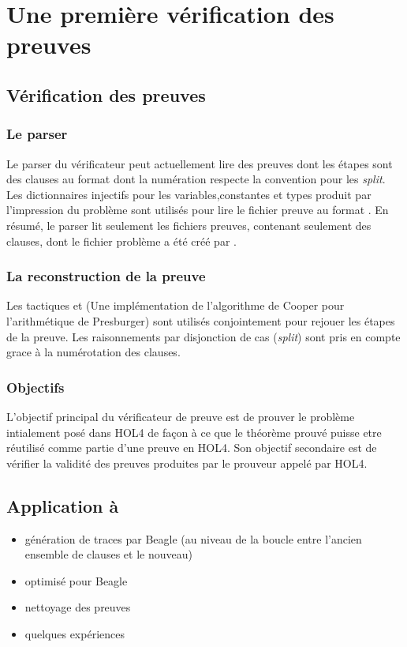 \section{Une première vérification des preuves \tff}
\label{sec:traces}

\subsection{Vérification des preuves}

\subsubsection{Le parser}
Le parser du vérificateur peut actuellement lire des preuves dont les étapes sont des clauses au format \tff dont la numération respecte la convention \tff pour les \textit{split}. Les dictionnaires injectifs pour les variables,constantes et types produit par l'impression du problème sont utilisés pour lire le fichier preuve au format \tff. En résumé, le parser lit seulement les fichiers preuves, contenant seulement des clauses, dont le fichier problème a été créé par \holfour.

\subsubsection{La reconstruction de la preuve}
Les tactiques \metistac et \coopertac (Une implémentation de l'algorithme de Cooper pour l'arithmétique de Presburger)
sont utilisés conjointement pour rejouer les étapes de la preuve. 
Les raisonnements par disjonction de cas (\textit{split}) sont pris en compte grace à la numérotation des clauses.

\subsubsection{Objectifs}
L'objectif principal du vérificateur de preuve est de prouver le problème intialement posé dans HOL4 de façon à ce que le théorème prouvé puisse etre réutilisé comme partie d'une preuve en HOL4. Son objectif secondaire est de vérifier la validité des preuves produites par le prouveur appelé par HOL4.

\subsection{Application à \beagle}
\begin{itemize}
\item génération de traces par Beagle (au niveau de la boucle entre
  l'ancien ensemble de clauses et le nouveau)
\item optimisé pour Beagle
\item nettoyage des preuves
\item quelques expériences
\end{itemize}

